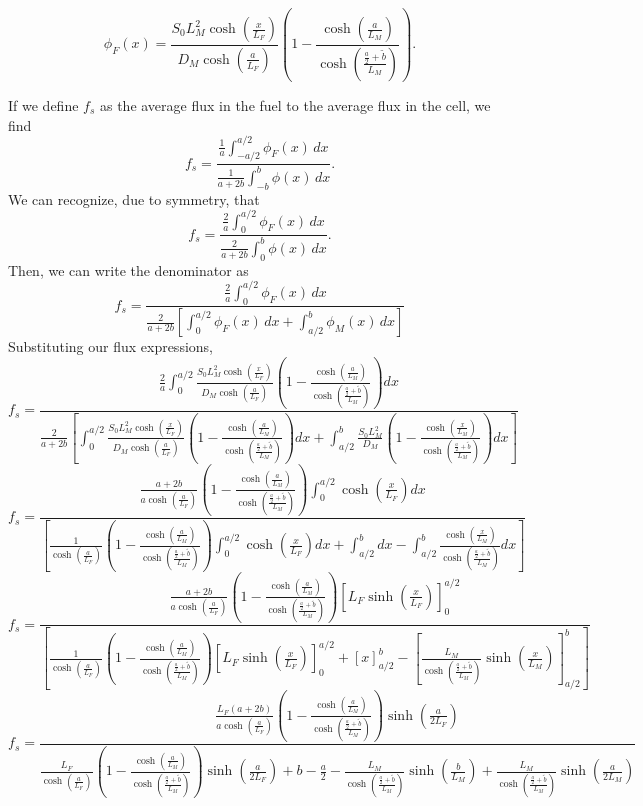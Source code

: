 \documentclass{article}
\begin{document}
$$\boxed{ \phi_F(x) = \frac{S_0 L_M^2 \cosh\left(\frac{x}{L_F}\right)}{D_M \cosh\left(\frac{a}{L_F}\right)}\left( 1 - \frac{\cosh\left(\frac{a}{L_M}\right)}{\cosh\left(\frac{\frac{a}{2}+\tilde{b}}{L_M}\right)}\right) }.$$

If we define $f_s$ as the average flux in the fuel to the average flux in the cell, we find
$$ f_s = \frac{\frac{1}{a}\int_{-a/2}^{a/2} \phi_F(x) \, dx}{\frac{1}{a+2b}\int_{-b}^{b} \phi(x) \, dx} .$$
We can recognize, due to symmetry, that
$$ f_s = \frac{\frac{2}{a}\int_{0}^{a/2} \phi_F(x) \, dx}{\frac{2}{a+2b}\int_{0}^{b} \phi(x) \, dx} .$$
Then, we can write the denominator as
$$ f_s = \frac{\frac{2}{a}\int_{0}^{a/2} \phi_F(x) \, dx}{\frac{2}{a+2b}\left[\int_{0}^{a/2} \phi_F(x) \, dx + \int_{a/2}^{b} \phi_M(x) \, dx \right]} $$
Substituting our flux expressions,
$$ f_s = \frac{\frac{2}{a}\int_{0}^{a/2} \frac{S_0 L_M^2 \cosh\left(\frac{x}{L_F}\right)}{D_M \cosh\left(\frac{a}{L_F}\right)}\left( 1 - \frac{\cosh\left(\frac{a}{L_M}\right)}{\cosh\left(\frac{\frac{a}{2}+\tilde{b}}{L_M}\right)}\right) dx}{\frac{2}{a+2b}\left[\int_{0}^{a/2} \frac{S_0 L_M^2 \cosh\left(\frac{x}{L_F}\right)}{D_M \cosh\left(\frac{a}{L_F}\right)}\left( 1 - \frac{\cosh\left(\frac{a}{L_M}\right)}{\cosh\left(\frac{\frac{a}{2}+\tilde{b}}{L_M}\right)}\right) dx + \int_{a/2}^{b} \frac{S_0 L_M^2}{D_M}\left( 1 - \frac{\cosh\left(\frac{x}{L_M}\right)}{\cosh\left(\frac{\frac{a}{2}+\tilde{b}}{L_M}\right)}\right) dx \right]} $$
$$ f_s = \frac{\frac{a+2b}{a \cosh\left(\frac{a}{L_F}\right)}\left( 1 - \frac{\cosh\left(\frac{a}{L_M}\right)}{\cosh\left(\frac{\frac{a}{2}+\tilde{b}}{L_M}\right)}\right)\int_{0}^{a/2} \cosh\left(\frac{x}{L_F}\right) dx}{\left[\frac{1}{\cosh\left(\frac{a}{L_F}\right)}\left( 1 - \frac{\cosh\left(\frac{a}{L_M}\right)}{\cosh\left(\frac{\frac{a}{2}+\tilde{b}}{L_M}\right)}\right) \int_{0}^{a/2} \cosh\left(\frac{x}{L_F}\right) dx + \int_{a/2}^{b} dx - \int_{a/2}^{b} \frac{\cosh\left(\frac{x}{L_M}\right)}{\cosh\left(\frac{\frac{a}{2}+\tilde{b}}{L_M}\right)} dx \right]} $$
$$ f_s = \frac{\frac{a+2b}{a \cosh\left(\frac{a}{L_F}\right)}\left( 1 - \frac{\cosh\left(\frac{a}{L_M}\right)}{\cosh\left(\frac{\frac{a}{2}+\tilde{b}}{L_M}\right)}\right)\left[L_F\sinh\left(\frac{x}{L_F}\right)\right]_{0}^{a/2}}{\left[\frac{1}{\cosh\left(\frac{a}{L_F}\right)}\left( 1 - \frac{\cosh\left(\frac{a}{L_M}\right)}{\cosh\left(\frac{\frac{a}{2}+\tilde{b}}{L_M}\right)}\right) \left[L_F\sinh\left(\frac{x}{L_F}\right)\right]_{0}^{a/2} + \left[x\right]_{a/2}^{b} - \left[\frac{L_M}{\cosh\left(\frac{\frac{a}{2}+\tilde{b}}{L_M}\right)}\sinh\left(\frac{x}{L_M}\right)\right]_{a/2}^{b} \right]} $$
$$\boxed{ f_s = \frac{\frac{L_F(a+2b)}{a \cosh\left(\frac{a}{L_F}\right)}\left( 1 - \frac{\cosh\left(\frac{a}{L_M}\right)}{\cosh\left(\frac{\frac{a}{2}+\tilde{b}}{L_M}\right)}\right)\sinh\left(\frac{a}{2L_F}\right)}{\frac{L_F}{\cosh\left(\frac{a}{L_F}\right)}\left( 1 - \frac{\cosh\left(\frac{a}{L_M}\right)}{\cosh\left(\frac{\frac{a}{2}+\tilde{b}}{L_M}\right)}\right) \sinh\left(\frac{a}{2L_F}\right) + b - \frac{a}{2} - \frac{L_M}{\cosh\left(\frac{\frac{a}{2}+\tilde{b}}{L_M}\right)}\sinh\left(\frac{b}{L_M}\right) + \frac{L_M}{\cosh\left(\frac{\frac{a}{2}+\tilde{b}}{L_M}\right)}\sinh\left(\frac{a}{2L_M}\right)} }$$
\end{document}

